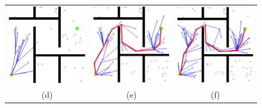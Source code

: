 \documentclass{article}
\begin{document}
\begin{figure}[H]
{\begin{tabular}{ccc}
			\includegraphics[scale=0.3]{fmt_paths/n_samples/3.png} & \includegraphics[scale=0.3]{fmt_paths/n_samples/4.png} & \includegraphics[scale=0.3]{fmt_paths/n_samples/5.png}\\
			(d) & (e) & (f)\\[6pt]

\end{tabular}}
\end{figure}
\end{document}
